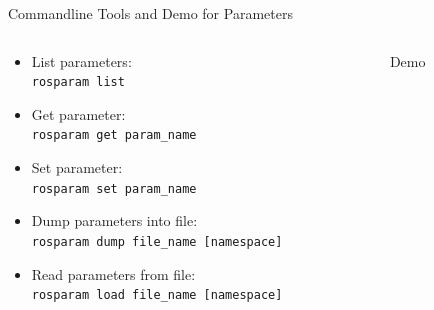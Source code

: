 \documentclass[aspectratio=43]{beamer}
\newcommand{\inline}[1]{\texttt{#1}}
\begin{document}
\begin{frame}{Commandline Tools and Demo for Parameters}
	\begin{columns}
		\begin{column}{0.5\textwidth}
			\begin{itemize}
				\item List parameters:\\\inline{rosparam list}
				\item Get parameter:\\\inline{rosparam get param_name}
				\item Set parameter:\\\inline{rosparam set param_name}
				\item Dump parameters into file:\\\inline{rosparam dump file_name [namespace]}
				\item Read parameters from file:\\\inline{rosparam load file_name [namespace]}
			\end{itemize}
		\end{column}
		\begin{column}{0.5\textwidth}
			\centering
      Demo
		\end{column}
	\end{columns}
\end{frame}

\end{document}
